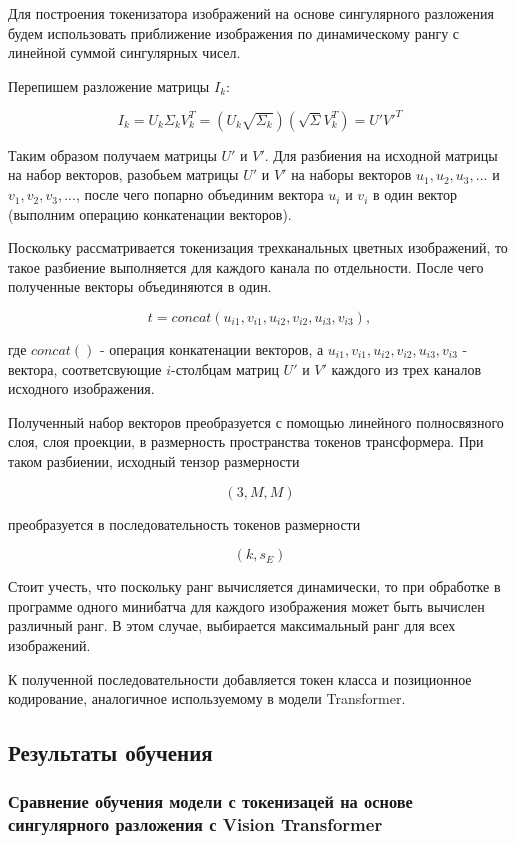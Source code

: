 \documentclass[times,specification,annotation]{itmo-student-thesis}
\begin{document}
Для построения токенизатора изображений на основе сингулярного разложения будем использовать приближение изображения по динамическому рангу с линейной суммой сингулярных чисел.

Перепишем разложение матрицы $I_k$:

$$
I_k = U_k\Sigma_kV_k^T = (U_k\sqrt{\Sigma_k})(\sqrt{\Sigma}V_k^T) = U'V'^T
$$

Таким образом получаем матрицы $U'$ и $V'$. Для разбиения на исходной матрицы на набор векторов, разобьем матрицы $U'$ и $V'$ на наборы векторов $u_1, u_2, u_3, ...$ и $v_1, v_2, v_3, ...$, после чего попарно объединим вектора $u_i$ и $v_i$ в один вектор (выполним операцию конкатенации векторов).

Поскольку рассматривается токенизация трехканальных цветных изображений, то такое разбиение выполняется для каждого канала по отдельности. После чего полученные векторы объединяются в один.

$$
t = concat(u_{i1}, v_{i1}, u_{i2}, v_{i2}, u_{i3}, v_{i3}),
$$

где $concat()$ - операция конкатенации векторов, а $u_{i1}, v_{i1}, u_{i2}, v_{i2}, u_{i3}, v_{i3}$ - вектора, соответсвующие $i$-столбцам матриц $U'$ и $V'$ каждого из трех каналов исходного изображения.

Полученный набор векторов преобразуется с помощью линейного полносвязного слоя, слоя проекции, в размерность пространства токенов трансформера. При таком разбиении, исходный тензор размерности

$$
(3, M, M)
$$

преобразуется в последовательность токенов размерности

$$
(k, s_E)
$$

Стоит учесть, что поскольку ранг вычисляется динамически, то при обработке в программе одного минибатча для каждого изображения может быть вычислен различный ранг. В этом случае, выбирается максимальный ранг для всех изображений.

К полученной последовательности добавляется токен класса и позиционное кодирование, аналогичное используемому в модели Transformer.

\subsection{Результаты обучения}

\subsubsection{Сравнение обучения модели с токенизацей на основе сингулярного разложения с Vision Transformer}
\end{document}
